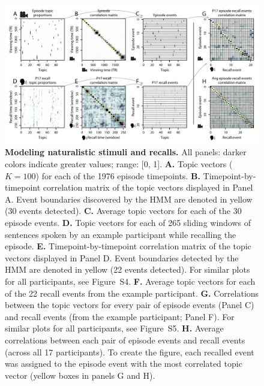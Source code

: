 \documentclass{article}
\newcommand{\corrmats}{S4}
\newcommand{\matchmats}{S5}
\begin{document}
\begin{figure}[tp]
\centering
\includegraphics[width=\textwidth]{figs/eventseg}
\caption{\small \textbf{Modeling naturalistic stimuli and recalls.} All panels: darker colors indicate greater values; range: [0, 1].  \textbf{A.} Topic vectors ($K = 100$) for each of the 1976 episode timepoints.  \textbf{B.} Timepoint-by-timepoint correlation matrix of the topic vectors displayed in Panel A.  Event boundaries discovered by the HMM are denoted in yellow (30 events detected).  \textbf{C.} Average topic vectors for each of the 30 episode events. \textbf{D.} Topic vectors for each of 265 sliding windows of sentences spoken by an example participant while recalling the episode.  \textbf{E.} Timepoint-by-timepoint correlation matrix of the topic vectors displayed in Panel D. Event boundaries detected by the HMM are denoted in yellow (22 events detected).  For similar plots for all participants, see Figure~\corrmats.  \textbf{F.} Average topic vectors for each of the 22 recall events from the example participant.  \textbf{G.} Correlations between the topic vectors for every pair of episode events (Panel C) and recall events (from the example participant; Panel F).  For similar plots for all participants, see Figure~\matchmats.  \textbf{H.} Average correlations between each pair of episode events and recall events (across all 17 participants).  To create the figure, each recalled event was assigned to the episode event with the most correlated topic vector (yellow boxes in panels G and H).}
\label{fig:model}
\end{figure}
\end{document}
